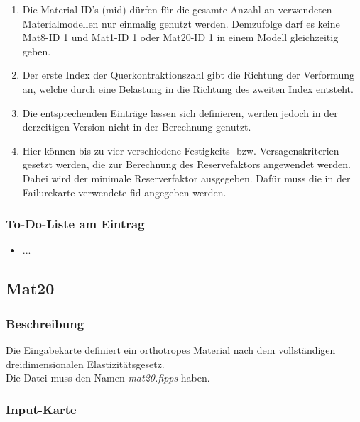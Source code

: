 \documentclass[11pt,titlepage,listof=totoc,bibliography=totoc,twoside]{scrreprt}
\begin{document}
{{\begin{enumerate}
\item Die Material-ID's (mid) dürfen für die gesamte Anzahl an verwendeten Materialmodellen nur einmalig genutzt werden. Demzufolge darf es keine Mat8-ID 1 und Mat1-ID 1 oder Mat20-ID 1 in einem Modell gleichzeitig geben.
\item Der erste Index der Querkontraktionszahl gibt die Richtung der Verformung an, welche durch eine Belastung in die Richtung des zweiten Index entsteht.
\item Die entsprechenden Einträge lassen sich definieren, werden jedoch in der derzeitigen Version nicht in der Berechnung genutzt.
\item Hier können bis zu vier verschiedene Festigkeits- bzw. Versagenskriterien gesetzt werden, die zur Berechnung des Reservefaktors angewendet werden. Dabei wird der minimale Reserverfaktor ausgegeben. Dafür muss die in der Failurekarte verwendete fid angegeben werden.
\end{enumerate}

\subsubsection{To-Do-Liste am Eintrag}

\begin{itemize}
\item ...
\end{itemize}

\newpage

\subsection{Mat20}

\subsubsection{Beschreibung}

Die Eingabekarte definiert ein orthotropes Material nach dem vollständigen dreidimensionalen Elastizitätsgesetz.\\
Die Datei muss den Namen \emph{mat20.fipps} haben.

\subsubsection{Input-Karte}

}}
\end{document}
